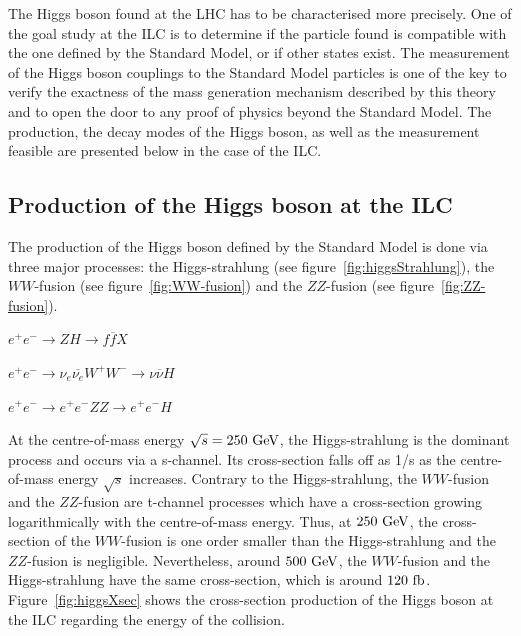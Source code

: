   The Higgs boson found at the \gls{LHC} has to be characterised more precisely.
  One of the goal study at the \gls{ILC} is to determine if the particle found is compatible with the one defined by the Standard Model, or if other states exist.
  The measurement of the Higgs boson couplings to the Standard Model particles is one of the key to verify the exactness of the mass generation mechanism described by this theory and to open the door to any proof of physics beyond the Standard Model.
  The production, the decay modes of the Higgs boson, as well as the measurement feasible are presented below in the case of the \gls{ILC}.

    \subsection{Production of the Higgs boson at the ILC}

    The production of the Higgs boson defined by the Standard Model is done via three major processes: the Higgs-strahlung (see figure~\ref{fig:higgsStrahlung}), the $WW$-fusion (see figure~\ref{fig:WW-fusion}) and the $ZZ$-fusion (see figure~\ref{fig:ZZ-fusion}).

    \begin{description}
      \centering
      \item[Higgs-strahlung:] $e^+e^- \rightarrow ZH \rightarrow f\overline{f}X$
      \item[$WW$-fusion:] $e^+e^- \rightarrow \nu_{e} \overline{\nu_{e}} W^+W^- \rightarrow \nu \overline{\nu} H$
      \item[$ZZ$-fusion:] $e^+e^- \rightarrow e^+e^- ZZ \rightarrow e^+e^- H$
    \end{description}

    At the centre-of-mass energy $\sqrt{s} = 250~\rm{GeV}$, the Higgs-strahlung is the dominant process and occurs via a s-channel. 
    Its cross-section falls off as 1/s as the centre-of-mass energy $\sqrt{s}$ increases.
    Contrary to the Higgs-strahlung, the $WW$-fusion and the $ZZ$-fusion are t-channel processes which have a cross-section growing logarithmically with the centre-of-mass energy.
    Thus, at $250~\rm{GeV}$, the cross-section of the $WW$-fusion is one order smaller than the Higgs-strahlung and the $ZZ$-fusion is negligible.
    Nevertheless, around $500~\rm{GeV}$, the $WW$-fusion and the Higgs-strahlung have the same cross-section, which is around $120~\rm{fb}$.
    Figure~\ref{fig:higgsXsec} shows the cross-section production of the Higgs boson at the \gls{ILC} regarding the energy of the collision.
    
